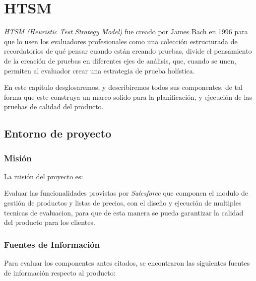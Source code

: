 \chapter{HTSM}

\emph{HTSM (Heuristic Test Strategy Model)} fue creado por James Bach en 1996
para que lo usen los evaluadores profesionales como una colección estructurada
de recordatorios de qué pensar cuando están creando pruebas, divide el
pensamiento de la creación de pruebas en diferentes ejes de análisis, que,
cuando se unen, permiten al evaluador crear una estrategia de prueba
holística\cite{Bach}.

En este capitulo desglosaremos, y describiremos todos sus componentes, de tal
forma que este construya un marco solido para la planificación, y ejecución de
las pruebas de calidad del producto.

\section{Entorno de proyecto}

\subsection{Misión}
La misión del proyecto es:

Evaluar las funcionalidades provistas por \emph{Salesforce} que componen el
modulo de gestión de productos y listas de precios, con el diseño y ejecución de
multiples tecnicas de evaluacion, para que de esta manera se pueda garantizar la
calidad del producto para los clientes.

\subsection{Fuentes de Información}
Para evaluar los componentes antes citados, se encontraron las siguientes
fuentes de información respecto al producto:


